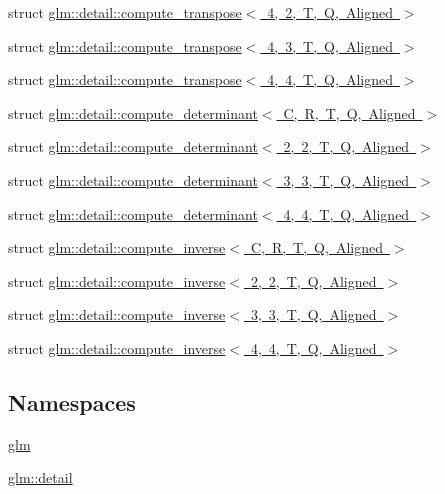 \begin{DoxyCompactItemize}
struct \mbox{\hyperlink{structglm_1_1detail_1_1compute__transpose_3_014_00_012_00_01_t_00_01_q_00_01_aligned_01_4}{glm\+::detail\+::compute\+\_\+transpose$<$ 4, 2, T, Q, Aligned $>$}}
\item 
struct \mbox{\hyperlink{structglm_1_1detail_1_1compute__transpose_3_014_00_013_00_01_t_00_01_q_00_01_aligned_01_4}{glm\+::detail\+::compute\+\_\+transpose$<$ 4, 3, T, Q, Aligned $>$}}
\item 
struct \mbox{\hyperlink{structglm_1_1detail_1_1compute__transpose_3_014_00_014_00_01_t_00_01_q_00_01_aligned_01_4}{glm\+::detail\+::compute\+\_\+transpose$<$ 4, 4, T, Q, Aligned $>$}}
\item 
struct \mbox{\hyperlink{structglm_1_1detail_1_1compute__determinant}{glm\+::detail\+::compute\+\_\+determinant$<$ C, R, T, Q, Aligned $>$}}
\item 
struct \mbox{\hyperlink{structglm_1_1detail_1_1compute__determinant_3_012_00_012_00_01_t_00_01_q_00_01_aligned_01_4}{glm\+::detail\+::compute\+\_\+determinant$<$ 2, 2, T, Q, Aligned $>$}}
\item 
struct \mbox{\hyperlink{structglm_1_1detail_1_1compute__determinant_3_013_00_013_00_01_t_00_01_q_00_01_aligned_01_4}{glm\+::detail\+::compute\+\_\+determinant$<$ 3, 3, T, Q, Aligned $>$}}
\item 
struct \mbox{\hyperlink{structglm_1_1detail_1_1compute__determinant_3_014_00_014_00_01_t_00_01_q_00_01_aligned_01_4}{glm\+::detail\+::compute\+\_\+determinant$<$ 4, 4, T, Q, Aligned $>$}}
\item 
struct \mbox{\hyperlink{structglm_1_1detail_1_1compute__inverse}{glm\+::detail\+::compute\+\_\+inverse$<$ C, R, T, Q, Aligned $>$}}
\item 
struct \mbox{\hyperlink{structglm_1_1detail_1_1compute__inverse_3_012_00_012_00_01_t_00_01_q_00_01_aligned_01_4}{glm\+::detail\+::compute\+\_\+inverse$<$ 2, 2, T, Q, Aligned $>$}}
\item 
struct \mbox{\hyperlink{structglm_1_1detail_1_1compute__inverse_3_013_00_013_00_01_t_00_01_q_00_01_aligned_01_4}{glm\+::detail\+::compute\+\_\+inverse$<$ 3, 3, T, Q, Aligned $>$}}
\item 
struct \mbox{\hyperlink{structglm_1_1detail_1_1compute__inverse_3_014_00_014_00_01_t_00_01_q_00_01_aligned_01_4}{glm\+::detail\+::compute\+\_\+inverse$<$ 4, 4, T, Q, Aligned $>$}}
\end{DoxyCompactItemize}
\subsection*{Namespaces}
\begin{DoxyCompactItemize}
\item 
 \mbox{\hyperlink{namespaceglm}{glm}}
\item 
 \mbox{\hyperlink{namespaceglm_1_1detail}{glm\+::detail}}
\end{DoxyCompactItemize}
